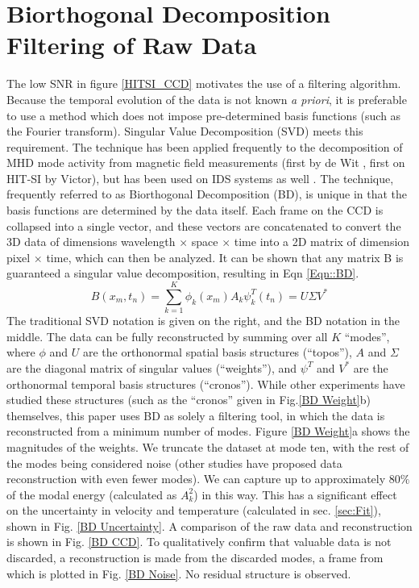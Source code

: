 \section{Biorthogonal Decomposition Filtering of Raw Data}\label{sec::BD}
\hspace{4ex}The low SNR in figure \ref{HITSI_CCD} motivates the use of a filtering algorithm. Because the temporal evolution of the data is not known \textit{a priori}, it is preferable to use a method which does not impose pre-determined basis functions (such as the Fourier transform). Singular Value Decomposition (SVD) meets this requirement. The technique has been applied frequently to the decomposition of MHD mode activity from magnetic field measurements (first by de Wit \cite{de1994biorthogonal}, first on HIT-SI by Victor\cite{BVictor}), but has been used on IDS systems as well \cite{fenzi20012d}. The technique, frequently referred to as Biorthogonal Decomposition (BD), is unique in that the basis functions are determined by the data itself. Each frame on the CCD is collapsed into a single vector, and these vectors are concatenated to convert the 3D data of dimensions wavelength $\times$ space $\times$ time into a 2D matrix of dimension pixel $\times$ time, which can then be analyzed. It can be shown\cite{kutz2013data} that any matrix B is guaranteed a singular value decomposition, resulting in Eqn \ref{Eqn::BD}.
\begin{equation}\label{Eqn::BD}
B(x_m,t_n)= \sum^K_{k=1}\phi_k(x_m)A_k\psi_k^T(t_n) = U\Sigma{V^*}
\end{equation}
The traditional SVD notation is given on the right, and the BD notation in the middle. The data can be fully reconstructed by summing over all $K$ ``modes'', where $\phi$ and $U$ are the orthonormal spatial basis structures (``topos''), $A$ and $\Sigma$ are the diagonal matrix of singular values (``weights''), and $\psi^T$ and $V^*$ are the orthonormal temporal basis structures (``cronos''). While other experiments have studied these structures (such as the ``cronos'' given in Fig.\ref{BD Weight}b) themselves\cite{fenzi20012d}, this paper uses BD as solely a filtering tool, in which the data is reconstructed from a minimum number of modes. Figure \ref{BD Weight}a shows the magnitudes of the weights. We truncate the dataset at mode ten, with the rest of the modes being considered noise (other studies have proposed data reconstruction with even fewer modes\cite{gavish2014optimal}). We can capture up to approximately $80\%$ of the modal energy (calculated as $A_k^2$)\cite{de1994biorthogonal} in this way. This has a significant effect on the uncertainty in velocity and temperature (calculated in sec. \ref{sec:Fit}), shown in Fig. \ref{BD Uncertainty}. A comparison of the raw data and reconstruction is shown in Fig. \ref{BD CCD}. To qualitatively confirm that valuable data is not discarded, a reconstruction is made from the discarded modes, a frame from which is plotted in Fig. \ref{BD Noise}. No residual structure is observed.
